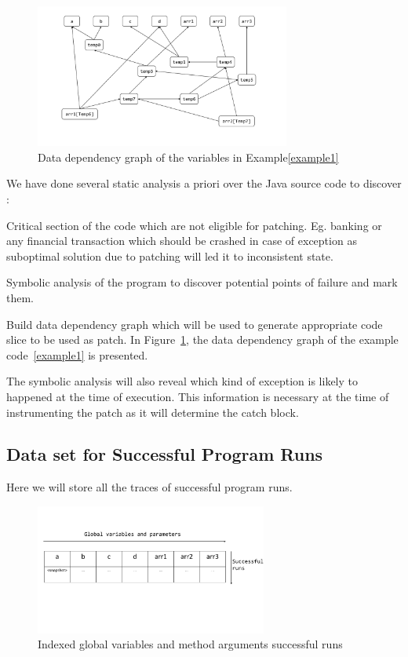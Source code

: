 \begin{figure}[t]
\centering
\includegraphics[width=3.3in]{images/depG.pdf}
\caption{Data dependency graph of the variables in Example\ref{example1}}
\label{fig:datadep}
\end{figure}

We have done several  static analysis a priori  over the Java source code to
discover :
\begin{mylist}
\item Critical section of the code which are not eligible for patching. Eg.
banking or any financial transaction which should be crashed in case of
exception as suboptimal solution due to patching will led it to inconsistent
state.
\item Symbolic analysis of the program to discover potential points of failure
and mark them.
\item Build data dependency graph which will be used to generate appropriate
code slice to be used as patch.
In Figure~\ref{fig:datadep}, the data dependency graph of the example
code~\ref{example1} is presented.
\item The symbolic analysis will also reveal which kind of exception is likely
to happened at the time of execution.
This information is necessary at the time of instrumenting the patch as it will
determine the catch block.
	
\end{mylist}

\subsection{Data set for Successful Program Runs}
\label{subsec:progrun}

Here we will store all the traces of successful program runs.
\begin{figure}[t]
\centering
\includegraphics[width=3.0in]{images/succrun.pdf}
\caption{Indexed global variables and method arguments successful runs}
\label{fig:succrun}
\end{figure}

